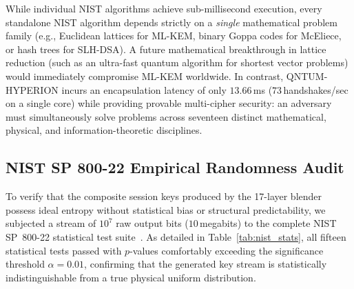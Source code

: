 \documentclass{ieeeaccess}
\begin{document}
While individual NIST algorithms achieve sub-millisecond execution, every standalone NIST algorithm depends strictly on a \emph{single} mathematical problem family (e.g., Euclidean lattices for ML-KEM, binary Goppa codes for McEliece, or hash trees for SLH-DSA). A future mathematical breakthrough in lattice reduction (such as an ultra-fast quantum algorithm for shortest vector problems) would immediately compromise ML-KEM worldwide. In contrast, \textsc{QNTUM-HYPERION} incurs an encapsulation latency of only $13.66$\,ms ($73$\,handshakes/sec on a single core) while providing provable multi-cipher security: an adversary must simultaneously solve problems across seventeen distinct mathematical, physical, and information-theoretic disciplines.

\subsection{NIST SP 800-22 Empirical Randomness Audit}
To verify that the composite session keys produced by the 17-layer blender possess ideal entropy without statistical bias or structural predictability, we subjected a stream of $10^7$ raw output bits ($10$\,megabits) to the complete NIST SP~800-22 statistical test suite~\cite{nist80022}. As detailed in Table~\ref{tab:nist_stats}, all fifteen statistical tests passed with $p$-values comfortably exceeding the significance threshold $\alpha = 0.01$, confirming that the generated key stream is statistically indistinguishable from a true physical uniform distribution.
\end{document}

